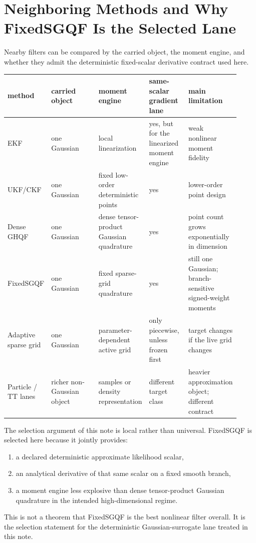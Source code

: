 \documentclass[11pt]{article}
\numberwithin{equation}{section}
\begin{document}
\section{Neighboring Methods and Why FixedSGQF Is the Selected Lane}
\label{sec:comparison}

Nearby filters can be compared by the carried object, the moment engine, and
whether they admit the deterministic fixed-scalar derivative contract used here.

\begin{center}
\small
\begin{tabular}{p{0.15\linewidth}p{0.21\linewidth}p{0.20\linewidth}p{0.17\linewidth}p{0.19\linewidth}}
\toprule
method & carried object & moment engine & same-scalar gradient lane & main limitation \\
\midrule
EKF & one Gaussian & local linearization & yes, but for the linearized moment engine & weak nonlinear moment fidelity \\
UKF/CKF & one Gaussian & fixed low-order deterministic points & yes & lower-order point design \cite{julier1996general,vandermerwe2004sigma,arasaratnam2009cubature} \\
Dense GHQF & one Gaussian & dense tensor-product Gaussian quadrature & yes & point count grows exponentially in dimension \\
FixedSGQF & one Gaussian & fixed sparse-grid quadrature & yes & still one Gaussian; branch-sensitive signed-weight moments \cite{jia2012sparsegrid} \\
Adaptive sparse grid & one Gaussian & parameter-dependent active grid & only piecewise, unless frozen first & target changes if the live grid changes \cite{singh2018adaptive} \\
Particle / TT lanes & richer non-Gaussian object & samples or density representation & different target class & heavier approximation object; different contract \cite{zhao2024ttsequential} \\
\bottomrule
\end{tabular}
\end{center}

The selection argument of this note is local rather than universal.  FixedSGQF
is selected here because it jointly provides:
\begin{enumerate}[leftmargin=0.3in]
  \item a declared deterministic approximate likelihood scalar,
  \item an analytical derivative of that same scalar on a fixed smooth branch,
  \item a moment engine less explosive than dense tensor-product Gaussian
  quadrature in the intended high-dimensional regime.
\end{enumerate}
This is not a theorem that FixedSGQF is the best nonlinear filter overall.  It
is the selection statement for the deterministic Gaussian-surrogate lane treated
in this note.
\end{document}
